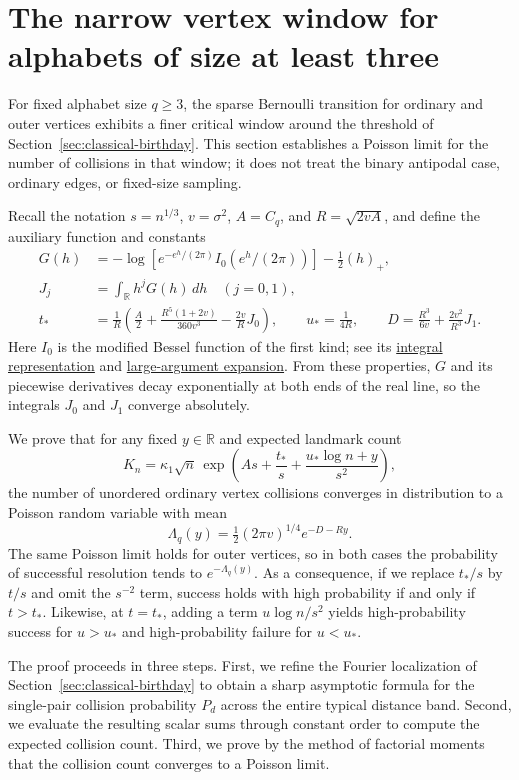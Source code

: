 \section{The narrow vertex window for alphabets of size at least three}
\label{sec:classical-poisson}

For fixed alphabet size \(q\ge3\), the sparse Bernoulli transition for ordinary and outer vertices exhibits a finer critical window around the threshold of Section~\ref{sec:classical-birthday}. This section establishes a Poisson limit for the number of collisions in that window; it does not treat the binary antipodal case, ordinary edges, or fixed-size sampling.

Recall the notation \(s=n^{1/3}\), \(v=\sigma^2\), \(A=C_q\), and \(R=\sqrt{2vA}\), and define the auxiliary function and constants
\[
 \begin{split}
 G(h)&=-\log\!\left[e^{-e^h/(2\pi)}
                   I_0(e^h/(2\pi))\right]-\tfrac12(h)_+,\\
 J_j&=\int_{\mathbb R} h^j G(h)\,dh\quad(j=0,1),\\
 t_*&=\frac1R\left(\frac A2+
    \frac{R^5(1+2v)}{360v^3}-\frac{2v}{R}J_0\right),
 \qquad u_*=\frac{1}{4R},
 \qquad D=\frac{R^3}{6v}+\frac{2v^2}{R^3}J_1 .
 \end{split}
\]
Here \(I_0\) is the modified Bessel function of the first kind; see its \href{https://dlmf.nist.gov/10.32.E1}{integral representation} and \href{https://dlmf.nist.gov/10.40.E1}{large-argument expansion}. From these properties, \(G\) and its piecewise derivatives decay exponentially at both ends of the real line, so the integrals \(J_0\) and \(J_1\) converge absolutely.

We prove that for any fixed \(y\in\mathbb R\) and expected landmark count
\[
 K_n=\kappa_1\sqrt n\,\exp\!\left(
 As+\frac{t_*}{s}+\frac{u_*\log n+y}{s^2}\right),
\]
the number of unordered ordinary vertex collisions converges in distribution to a Poisson random variable with mean
\[
 \Lambda_q(y)=\tfrac12(2\pi v)^{1/4}e^{-D-Ry}.
\]
The same Poisson limit holds for outer vertices, so in both cases the probability of successful resolution tends to \(e^{-\Lambda_q(y)}\). As a consequence, if we replace \(t_*/s\) by \(t/s\) and omit the \(s^{-2}\) term, success holds with high probability if and only if \(t>t_*\). Likewise, at \(t=t_*\), adding a term \(u\log n/s^2\) yields high-probability success for \(u>u_*\) and high-probability failure for \(u<u_*\).

The proof proceeds in three steps. First, we refine the Fourier localization of Section~\ref{sec:classical-birthday} to obtain a sharp asymptotic formula for the single-pair collision probability \(P_d\) across the entire typical distance band. Second, we evaluate the resulting scalar sums through constant order to compute the expected collision count. Third, we prove by the method of factorial moments that the collision count converges to a Poisson limit.

